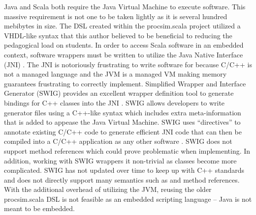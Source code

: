 Java and Scala both require the Java Virtual Machine to execute software. This massive requirement is not one to be taken lightly as it is several hundred mebibytes in size. The DSL created within the procsim.scala project utilized a VHDL-like syntax that this author believed to be beneficial to reducing the pedagogical load on students. In order to access Scala software in an embedded context, software wrappers must be written to utilize the Java Native Interface (JNI) \cite{Oracle:JNI}. The JNI is notoriously frustrating to write software for because C/C++ is not a managed language and the JVM is a managed VM making memory guarantees frustrating to correctly implement. Simplified Wrapper and Interface Generator (SWIG) provides an excellent wrapper definition tool to generate bindings for C++ classes into the JNI \cite{SWIG:Homepage}. SWIG allows developers to write generator files using a C++-like syntax which includes extra meta-information that is added to appease the Java Virtual Machine. SWIG uses ``directives'' to annotate existing C/C++ code to generate efficient JNI code that can then be compiled into a C/C++ application as any other software \cite{SWIG:Java}. SWIG does not support method references which could prove problematic when implementing. In addition, working with SWIG wrappers it non-trivial as classes become more complicated. SWIG has not updated over time to keep up with C++ standards and does not directly support many semantics such as  and method references. With the additional overhead of utilizing the JVM, reusing the older procsim.scala DSL is not feasible as an embedded scripting language -- Java is not meant to be embedded.

